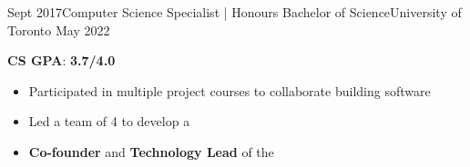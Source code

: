 %
%
%


\begin{experiences}
  \university
    {Sept 2017}{Computer Science Specialist | Honours Bachelor of Science}{University of Toronto}
    {May 2022} {
                      \textbf{CS GPA}: \textbf{3.7/4.0}
                      \begin{itemize}
                        \setlength\itemsep{0.2em}
                        \item Participated in multiple project courses to collaborate building software
                        \item Led a team of 4 to develop a 
                        \item \textbf{Co-founder} and \textbf{Technology Lead} of the 
                      \end{itemize}
                    }
\end{experiences}
